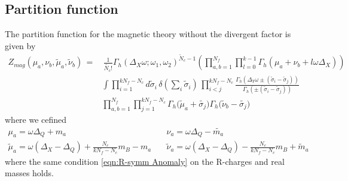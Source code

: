 \subsection{Partition function}
The partition function for the magnetic theory without the divergent factor is given by
\begin{equation}
\begin{aligned}
Z_{mag} ( \mu_a , \nu_b , \tilde{\mu}_a, \tilde{\nu}_b ) \,= & \, \frac{1}{\tilde{N_c}!}
 \Gamma_h ( \Delta_X \omega ; \omega_1 , \omega_2)^{ \tilde N_c-1}
\left( \prod_{a,b=1}^{N_f}   \prod_{l=0}^{k-1} \Gamma_h \left( \mu_a+  \nu_b + l \omega \Delta_X \right)  \right) \\
&\int
\prod_{i=1}^{ kN_f - N_c} d \tilde{\sigma}_i \, \delta( \sum_i \tilde{\sigma}_i) \,
 \prod_{i<j}^{kN_f - N_c} \frac{ \Gamma_h( \Delta_Y \omega \pm (\tilde{\sigma}_i - \tilde{\sigma}_j)) }{ \Gamma_h ( \pm (\tilde{\sigma}_i - \tilde{\sigma}_j) )} \\
 &  \prod_{a,b=1}^{N_f} \prod_{j=1}^{k N_f - N_c} \Gamma_h \big( \tilde{ \mu}_a + \tilde{\sigma_j} \big) \Gamma_h \big( \tilde{\nu}_b - \tilde{\sigma_j} \big)
\end{aligned}
\end{equation}
where we cefined
\begin{equation}
\begin{aligned}
 \mu_a = \omega \Delta_Q + m_a  
 &\quad \nu_a = \omega \Delta_Q - \tilde{m_a}\\
 \tilde \mu_a = \omega ( \Delta_X - \Delta_Q ) + \frac{N_c}{k N_f - N_c} m_B - m_a  
 &  \quad \tilde \nu_a = \omega ( \Delta_X - \Delta_Q ) - \frac{N_c}{k N_f - N_c} m_B + \tilde m_a
\end{aligned}
\end{equation}
where the same condition \eqref{eqn:R-symm Anomaly} on the R-charges and real masses  holds.\\

